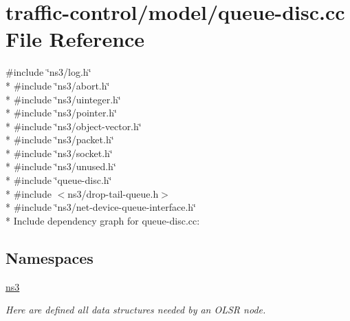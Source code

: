\hypertarget{queue-disc_8cc}{}\section{traffic-\/control/model/queue-\/disc.cc File Reference}
\label{queue-disc_8cc}
{\ttfamily \#include \char`\"{}ns3/log.\+h\char`\"{}}\\*
{\ttfamily \#include \char`\"{}ns3/abort.\+h\char`\"{}}\\*
{\ttfamily \#include \char`\"{}ns3/uinteger.\+h\char`\"{}}\\*
{\ttfamily \#include \char`\"{}ns3/pointer.\+h\char`\"{}}\\*
{\ttfamily \#include \char`\"{}ns3/object-\/vector.\+h\char`\"{}}\\*
{\ttfamily \#include \char`\"{}ns3/packet.\+h\char`\"{}}\\*
{\ttfamily \#include \char`\"{}ns3/socket.\+h\char`\"{}}\\*
{\ttfamily \#include \char`\"{}ns3/unused.\+h\char`\"{}}\\*
{\ttfamily \#include \char`\"{}queue-\/disc.\+h\char`\"{}}\\*
{\ttfamily \#include $<$ns3/drop-\/tail-\/queue.\+h$>$}\\*
{\ttfamily \#include \char`\"{}ns3/net-\/device-\/queue-\/interface.\+h\char`\"{}}\\*
Include dependency graph for queue-\/disc.cc\+:
\subsection*{Namespaces}
\begin{DoxyCompactItemize}
\item 
 \hyperlink{namespacens3}{ns3}
\begin{DoxyCompactList}\small\item\em Here are defined all data structures needed by an O\+L\+SR node. \end{DoxyCompactList}\end{DoxyCompactItemize}
